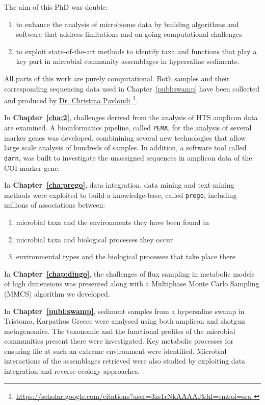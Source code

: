    The aim of this PhD was double:
   \begin{enumerate}
      \item to enhance the analysis of microbiome data 
            by building algorithms and software 
            that address limitations and on-going computational challenges
      \item to exploit state-of-the-art methods to identify taxa and functions  
            that play a key part in microbial community assemblages in hypersaline sediments.
   \end{enumerate}
   All parts of this work are purely computational. 
   Both samples and their corresponding sequencing data used in Chapter~\ref{publ:swamp} have been collected 
   and produced by 
   \href{https://scholar.google.com/citations?user=3zs1rNkAAAAJ&hl=en&oi=sra}{Dr. Christina Pavloudi} \footnote{
      \href{https://scholar.google.com/citations?user=3zs1rNkAAAAJ&hl=en&oi=sra}{
         https://scholar.google.com/citations?user=3zs1rNkAAAAJ\&hl=en\&oi=sra
      }
   }. 

   In \textbf{Chapter~\ref{cha:2}}, challenges derived from the analysis of HTS amplicon data are examined.
   A bioinformatics pipeline, called \texttt{PEMA}, for the analysis of several marker genes was developed, combinining several new technologies that allow large scale analysis of hundreds of samples. 
   In addition, a software tool called \texttt{darn}, was built to investigate the unassigned sequences in amplicon data of the COI marker gene. 

   In \textbf{Chapter~\ref{cha:prego}}, data integration, data mining and text-mining methods were exploited to build a knowledge-base, called \texttt{prego}, including millions of associations between:
   \begin{enumerate}
      \item microbial taxa and the environments they have been found in 
      \item microbial taxa and biological processes they occur
      \item environmental types and the biological processes that take place there
   \end{enumerate}

   In \textbf{Chapter~\ref{chap:dingo}}, the challenges of flux sampling in metabolic models of high dimensions was presented along with a Multiphase Monte Carlo Sampling (MMCS) algorithm we developed. 

   In \textbf{Chapter~\ref{publ:swamp}}, sediment samples from a hypersaline swamp in Tristomo, Karpathos Greece were analysed using both amplicon and shotgun metagenomics. 
   The taxonomic and the functional profiles of the microbial communities present there were investigated. 
   Key metabolic processes for ensuring life at such an extreme environment were identified.
   Microbial interactions of the assemblages retrieved were also studied by exploiting 
   data integration and reverse ecology approaches.  

